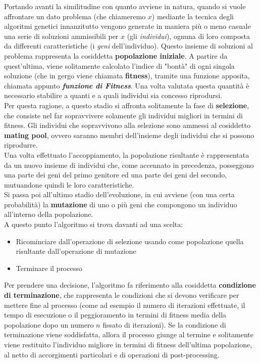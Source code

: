     Portando avanti la similitudine con quanto avviene in natura, quando si vuole affrontare un dato problema (che chiameremo $x$) mediante la tecnica degli algoritmi genetici innanzitutto vengono generate in maniera più o meno casuale una serie di soluzioni ammissibili per $x$ (gli \textit{individui}), ognuna di loro composta da differenti caratteristiche (i \textit{geni} dell'individuo). Questo insieme di soluzioni al problema rappresenta la cosiddetta \textbf{popolazione iniziale}. A partire da quest'ultima, viene solitamente calcolato l'indice di "bontà" di ogni singola soluzione (che in gergo viene chiamata \textbf{fitness}), tramite una funzione apposita, chiamata appunto \textbf{\textit{funzione di Fitness}}. Una volta valutata questa quantità è necessario stabilire a quanti e a quali individui sia concesso riprodursi. \\
    Per questa ragione, a questo stadio si affronta solitamente la fase di \textbf{selezione}, che consiste nel far sopravvivere solamente gli individui migliori in termini di fitness. Gli individui che sopravvivono alla selezione sono ammessi al cosiddetto \textbf{mating pool}, ovvero saranno membri dell'insieme degli individui che si possono riprodurre. \\
    Una volta effettuato l'accoppiamento, la popolazione risultante è rappresentata da un nuovo insieme di individui che, come accennato in precedenza, posseggono una parte dei geni del primo genitore ed una parte dei geni del secondo, mutuandone quindi le loro caratteristiche. \\
    Si passa poi all'ultimo stadio dell'evoluzione, in cui avviene (con una certa probabilità) la \textbf{mutazione} di uno o più geni che compongono un individuo all'interno della popolazione. \\
    A questo punto l'algoritmo si trova davanti ad una scelta: 
    \begin{itemize}
        \item Ricominciare dall'operazione di selezione usando come popolazione quella risultante dall'operazione di mutazione
        \item Terminare il processo
    \end{itemize}

    Per prendere una decisione, l'algoritmo fa riferimento alla cosiddetta \textbf{condizione di terminazione}, che rappresenta le condizioni che si devono verificare per mettere fine al processo (come ad esempio il numero di iterazioni effettuate, il tempo di esecuzione o il peggioramento in termini di fitness media della popolazione dopo un numero $n$ fissato di iterazioni). Se la condizione di terminazione viene soddisfatta, allora il processo giunge al termine e solitamente viene restituito l'individuo migliore in termini di fitness dell'ultima popolazione, al netto di accorgimenti particolari e di operazioni di post-processing.

